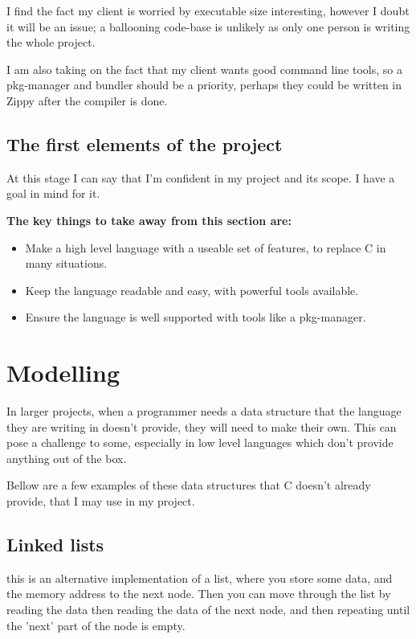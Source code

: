 \documentclass[a4paper,12pt]{article}
\begin{document}
{I find the fact my client is worried by executable size interesting, however
I doubt it will be an issue; a ballooning code-base is unlikely as only one 
person is writing the whole project.

I am also taking on the fact that my client wants good command line tools,
so a pkg-manager and bundler should be a priority, perhaps they could be 
written in Zippy after the compiler is done.

\subsection{The first elements of the project}
At this stage I can say that I'm confident in my project and its scope. I
have a goal in mind for
it.

\textbf{The key things to take away from this section are:}

\begin{itemize}
	\item
		Make a high level language with a useable set of features, to
		replace C in many situations.

	\item
		Keep the language readable and easy, with powerful tools available.

	\item
		Ensure the language is well supported with tools like a pkg-manager.
\end{itemize}

\section{Modelling}
In larger projects, when a programmer needs a data structure that the language
they are writing in doesn't provide, they will need to make their own. This can pose a
challenge to some, especially in low level languages which don't provide anything 
out of the box. 

Bellow are a few examples of these data structures that C doesn't already provide,
that I may use in my project.
\subsection{Linked lists}
this is an alternative implementation of a list, where you store some data, and 
the memory address to the next node. Then you can move through the list by reading 
the data then reading the data of the next node, and then repeating until the 
'next' part of the node is empty.
\\

}
\end{document}
